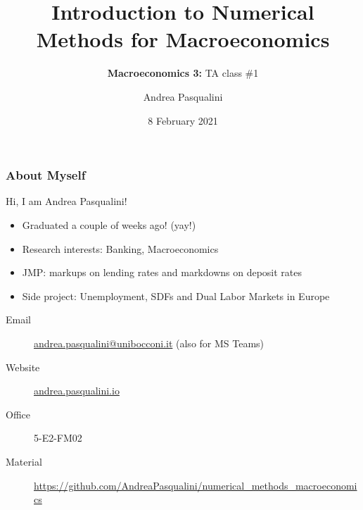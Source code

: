 \documentclass[10pt, aspectratio=1610, handout]{beamer}
\title[Intro to Numerical Methods for Macro]{
  \textbf{Introduction to Numerical Methods for Macroeconomics}
}
\subtitle[Macro 3: TA\#1]{
  \textbf{Macroeconomics 3:} TA class \#1
}
\author[A.~Pasqualini]{
  Andrea Pasqualini
}
\institute[Bocconi]{Bocconi University}
\date{
  8 February 2021
}
\newcommand{\email}[1]{\href{mailto:#1}{#1}}
\newcommand{\website}[1]{\href{https://#1}{#1}}
\begin{document}
  \begin{frame}
    \maketitle
  \end{frame}

  \begin{frame}
    \frametitle{About Myself}

    Hi, I am Andrea Pasqualini!

    \vfill\pause

    \begin{itemize}
      \item Graduated a couple of weeks ago! (yay!)
      \item Research interests: Banking, Macroeconomics
      \item JMP: markups on lending rates and markdowns on deposit rates
      \item Side project: Unemployment, SDFs and Dual Labor Markets in Europe
    \end{itemize}

    \vfill\pause

    \begin{description}
      \item[Email] \email{andrea.pasqualini@unibocconi.it} (also for MS Teams)
      \item[Website] \website{andrea.pasqualini.io}
      \item[Office] 5-E2-FM02
      \item[Material] \href{https://github.com/AndreaPasqualini/numerical_methods_macroeconomics}{https://github.com/AndreaPasqualini/numerical\_methods\_macroeconomics}
    \end{description}

  \end{frame}
\end{document}
